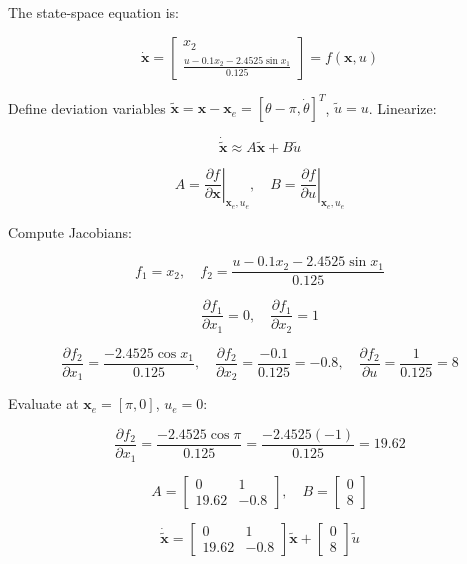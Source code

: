 \documentclass[12pt,a4paper]{article}
\begin{document}
The state-space equation is:

\begin{equation}
\dot{\mathbf{x}} = \begin{bmatrix} x_2 \\ \frac{u - 0.1 x_2 - 2.4525 \sin x_1}{0.125} \end{bmatrix} = f(\mathbf{x}, u)
\end{equation}

Define deviation variables \( \tilde{\mathbf{x}} = \mathbf{x} - \mathbf{x}_e = [\theta - \pi, \dot{\theta}]^T \), \( \tilde{u} = u \). Linearize:

\begin{equation}
\dot{\tilde{\mathbf{x}}} \approx A \tilde{\mathbf{x}} + B \tilde{u}
\end{equation}

\[
A = \left. \frac{\partial f}{\partial \mathbf{x}} \right|_{\mathbf{x}_e, u_e}, \quad B = \left. \frac{\partial f}{\partial u} \right|_{\mathbf{x}_e, u_e}
\]

Compute Jacobians:

\[
f_1 = x_2, \quad f_2 = \frac{u - 0.1 x_2 - 2.4525 \sin x_1}{0.125}
\]

\[
\frac{\partial f_1}{\partial x_1} = 0, \quad \frac{\partial f_1}{\partial x_2} = 1
\]

\[
\frac{\partial f_2}{\partial x_1} = \frac{-2.4525 \cos x_1}{0.125}, \quad \frac{\partial f_2}{\partial x_2} = \frac{-0.1}{0.125} = -0.8, \quad \frac{\partial f_2}{\partial u} = \frac{1}{0.125} = 8
\]

Evaluate at \( \mathbf{x}_e = [\pi, 0] \), \( u_e = 0 \):

\[
\frac{\partial f_2}{\partial x_1} = \frac{-2.4525 \cos \pi}{0.125} = \frac{-2.4525 (-1)}{0.125} = 19.62
\]

\[
A = \begin{bmatrix} 0 & 1 \\ 19.62 & -0.8 \end{bmatrix}, \quad B = \begin{bmatrix} 0 \\ 8 \end{bmatrix}
\]

\[
\dot{\tilde{\mathbf{x}}} = \begin{bmatrix} 0 & 1 \\ 19.62 & -0.8 \end{bmatrix} \tilde{\mathbf{x}} + \begin{bmatrix} 0 \\ 8 \end{bmatrix} \tilde{u}
\]
\end{document}
